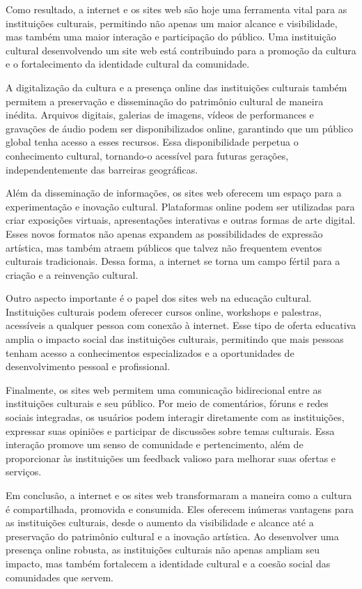 Como resultado, a internet e os sites web são hoje uma ferramenta vital para as instituições culturais, permitindo não apenas um maior alcance e visibilidade, mas também uma maior interação e participação do público. Uma instituição cultural desenvolvendo um site web está contribuindo para a promoção da cultura e o fortalecimento da identidade cultural da comunidade.

A digitalização da cultura e a presença online das instituições culturais também permitem a preservação e disseminação do patrimônio cultural de maneira inédita. Arquivos digitais, galerias de imagens, vídeos de performances e gravações de áudio podem ser disponibilizados online, garantindo que um público global tenha acesso a esses recursos. Essa disponibilidade perpetua o conhecimento cultural, tornando-o acessível para futuras gerações, independentemente das barreiras geográficas.

Além da disseminação de informações, os sites web oferecem um espaço para a experimentação e inovação cultural. Plataformas online podem ser utilizadas para criar exposições virtuais, apresentações interativas e outras formas de arte digital. Esses novos formatos não apenas expandem as possibilidades de expressão artística, mas também atraem públicos que talvez não frequentem eventos culturais tradicionais. Dessa forma, a internet se torna um campo fértil para a criação e a reinvenção cultural.

Outro aspecto importante é o papel dos sites web na educação cultural. Instituições culturais podem oferecer cursos online, workshops e palestras, acessíveis a qualquer pessoa com conexão à internet. Esse tipo de oferta educativa amplia o impacto social das instituições culturais, permitindo que mais pessoas tenham acesso a conhecimentos especializados e a oportunidades de desenvolvimento pessoal e profissional.

Finalmente, os sites web permitem uma comunicação bidirecional entre as instituições culturais e seu público. Por meio de comentários, fóruns e redes sociais integradas, os usuários podem interagir diretamente com as instituições, expressar suas opiniões e participar de discussões sobre temas culturais. Essa interação promove um senso de comunidade e pertencimento, além de proporcionar às instituições um feedback valioso para melhorar suas ofertas e serviços.

Em conclusão, a internet e os sites web transformaram a maneira como a cultura é compartilhada, promovida e consumida. Eles oferecem inúmeras vantagens para as instituições culturais, desde o aumento da visibilidade e alcance até a preservação do patrimônio cultural e a inovação artística. Ao desenvolver uma presença online robusta, as instituições culturais não apenas ampliam seu impacto, mas também fortalecem a identidade cultural e a coesão social das comunidades que servem.

